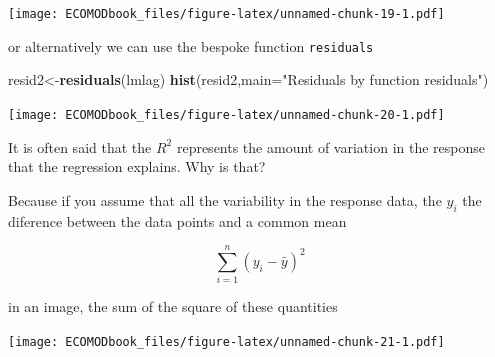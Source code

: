 \documentclass[
]{book}
\newenvironment{Shaded}{\begin{snugshade}}{\end{snugshade}}
\newcommand{\CommentTok}[1]{\textcolor[rgb]{0.56,0.35,0.01}{\textit{#1}}}
\newcommand{\DataTypeTok}[1]{\textcolor[rgb]{0.13,0.29,0.53}{#1}}
\newcommand{\DecValTok}[1]{\textcolor[rgb]{0.00,0.00,0.81}{#1}}
\newcommand{\KeywordTok}[1]{\textcolor[rgb]{0.13,0.29,0.53}{\textbf{#1}}}
\newcommand{\NormalTok}[1]{#1}
\newcommand{\OperatorTok}[1]{\textcolor[rgb]{0.81,0.36,0.00}{\textbf{#1}}}
\newcommand{\StringTok}[1]{\textcolor[rgb]{0.31,0.60,0.02}{#1}}
\begin{document}
\texttt{[image: ECOMODbook\_files/figure-latex/unnamed-chunk-19-1.pdf]}

or alternatively we can use the bespoke function \texttt{residuals}

\begin{Shaded}
\begin{Highlighting}[]
\NormalTok{resid2<-}\KeywordTok{residuals}\NormalTok{(lmlag)}
\KeywordTok{hist}\NormalTok{(resid2,}\DataTypeTok{main=}\StringTok{"Residuals by function residuals"}\NormalTok{)}
\end{Highlighting}
\end{Shaded}

\texttt{[image: ECOMODbook\_files/figure-latex/unnamed-chunk-20-1.pdf]}

It is often said that the \(R^2\) represents the amount of variation in the response that the regression explains. Why is that?

Because if you assume that all the variability in the response data, the \(y_i\) the diference between the data points and a common mean

\[\sum_{i=1}^n (y_i- \bar y)^2\]

in an image, the sum of the square of these quantities

\begin{Shaded}
\end{Shaded}

\texttt{[image: ECOMODbook\_files/figure-latex/unnamed-chunk-21-1.pdf]}

\begin{Shaded}
\end{Shaded}
\end{document}
